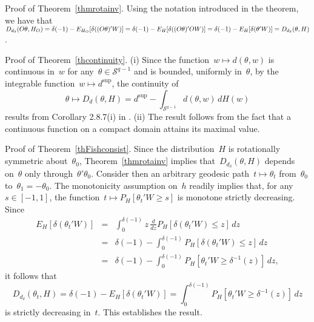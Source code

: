 \documentclass[usenames,dvipsnames]{article}
\begin{document}

Proof of Theorem~\ref{thmrotainv}.
Using the notation introduced in the theorem, we have that $D_{d_{\delta}}(O\theta, H_O)
=\delta(-1)-E_{H_O}[\delta((O\theta)'W)]
=\delta(-1)-E_{H}[\delta((O\theta)'OW)]
=\delta(-1)
\linebreak
-E_{H}[\delta(\theta'W)]
=D_{d_{\delta}}(\theta, H)$.
\cqfd
\vspace{3mm}


Proof of Theorem~\ref{thcontinuity}.
(i) Since the function~$w\mapsto d(\theta,w)$ is continuous in~$w$ for any~$\theta\in\mathcal{S}^{q-1}$ and is bounded, uniformly in~$\theta$, by the integrable function~$w\mapsto d^{\sup}$, the continuity of
$$ 
\theta\mapsto D_{d}(\theta, H)
=
d^{\sup}
-
\int_{\mathcal{S}^{q-1}}
d(\theta,w)
\,
dH(w)
$$
results from Corollary 2.8.7(i) in \cite{Bog2007}. (ii) The result follows from the fact that  a continuous function on a compact domain attains its maximal value.
\cqfd
\vspace{3mm}


Proof of Theorem~\ref{thFishconsist}.
Since the distribution~$H$ is rotationally symmetric about~$\theta_0$, Theorem~\ref{thmrotainv} implies that~$D_{d_{\delta}}(\theta, H)$ depends on~$\theta$ only through~$\theta'\theta_0$. Consider then an arbitrary geodesic path~$t\mapsto \theta_t$ from~$\theta_0$ to~$\theta_1=-\theta_0$. The monotonicity assumption on~$h$ readily implies that, for any~$s\in[-1,1]$, the function~$t\mapsto P_{H}[ \theta_t'W \geq s]$ is monotone strictly decreasing. 
Since
\begin{eqnarray*}
E_H[\delta(\theta_t' W)]
&=&
\int_{0}^{\delta(-1)} z\, \frac{d}{dz} P_{H}[ \delta(\theta_t'W) \leq z] \,dz
\\[2mm]
&=&
\delta(-1) - \int_{0}^{\delta(-1)} P_{H}[ \delta(\theta_t'W) \leq z] \,dz
\\[2mm]
&=&
\delta(-1) - \int_{0}^{\delta(-1)} P_{H}[ \theta_t'W \geq \delta^{-1}(z)] \,dz
,
\end{eqnarray*}
it follows that
\begin{equation}
	\label{ahahah}
D_{d_{\delta}}(\theta_t, H)
=
\delta(-1)-E_H[\delta(\theta_t' W)]
=
\int_{0}^{\delta(-1)} P_{H}[ \theta_t'W \geq \delta^{-1}(z)] \,dz
\end{equation}
is strictly decreasing in~$t$. This establishes the result.
\cqfd
\vspace{3mm}
\end{document}
